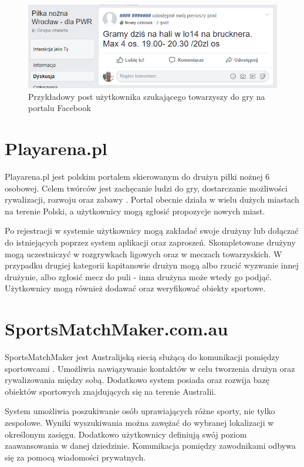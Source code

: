 \begin{figure}[H]
\centering
\includegraphics[width=0.6\linewidth]{02-istniejace-rozwiazania/rys/ss-fb.PNG}
\caption{Przykładowy post użytkownika szukającego towarzyszy do gry na portalu Facebook}
\label{fig:ss-fb}
\end{figure}


\section{Playarena.pl}

Playarena.pl jest polskim portalem skierowanym do drużyn piłki nożnej 6 osobowej. Celem twórców jest zachęcanie ludzi do gry, dostarczanie możliwości rywalizacji, rozwoju oraz zabawy \cite{playarena}. Portal obecnie działa w wielu dużych miastach na terenie Polski, a użytkownicy mogą zgłosić propozycje nowych miast.

Po rejestracji w systemie użytkownicy mogą zakładać swoje drużyny lub dołączać do istniejących poprzez system aplikacji oraz zaproszeń. Skompletowane drużyny mogą uczestniczyć w rozgrywkach ligowych oraz w meczach towarzyskich. W przypadku drugiej kategorii kapitanowie drużyn mogą albo rzucić wyzwanie innej drużynie, albo zgłosić mecz do puli - inna drużyna może wtedy go podjąć. Użytkownicy mogą również dodawać oraz weryfikować obiekty sportowe.  


\section{SportsMatchMaker.com.au}

SportsMatchMaker jest Australijską siecią służącą do komunikacji pomiędzy sportowcami \cite{smmau}. Umożliwia nawiązywanie kontaktów w celu tworzenia drużyn oraz rywalizowania między sobą. Dodatkowo system posiada oraz rozwija bazę obiektów sportowych znajdujących się na terenie Australii. 

System umożliwia poszukiwanie osób uprawiających różne sporty, nie tylko zespołowe. Wyniki wyszukiwania można zawężać do wybranej lokalizacji w określonym zasięgu. Dodatkowo użytkownicy definiują swój poziom zaawansowania w danej dziedzinie. Komunikacja pomiędzy zawodnikami odbywa się za pomocą wiadomości prywatnych.


